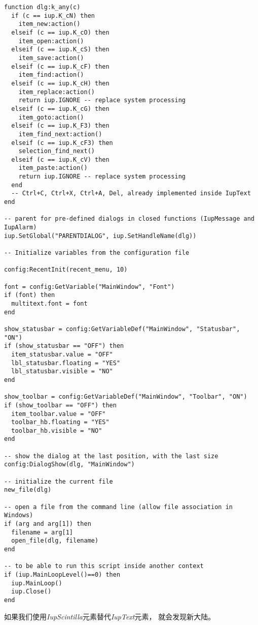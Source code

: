\documentclass{ctexart}
\begin{document}
\begin{lstlisting}
function dlg:k_any(c)
  if (c == iup.K_cN) then
    item_new:action()
  elseif (c == iup.K_cO) then
    item_open:action()
  elseif (c == iup.K_cS) then
    item_save:action()
  elseif (c == iup.K_cF) then
    item_find:action()
  elseif (c == iup.K_cH) then
    item_replace:action()
    return iup.IGNORE -- replace system processing
  elseif (c == iup.K_cG) then
    item_goto:action()
  elseif (c == iup.K_F3) then
    item_find_next:action()
  elseif (c == iup.K_cF3) then
    selection_find_next()
  elseif (c == iup.K_cV) then
    item_paste:action()  
    return iup.IGNORE -- replace system processing
  end
  -- Ctrl+C, Ctrl+X, Ctrl+A, Del, already implemented inside IupText
end

-- parent for pre-defined dialogs in closed functions (IupMessage and IupAlarm)
iup.SetGlobal("PARENTDIALOG", iup.SetHandleName(dlg))

-- Initialize variables from the configuration file

config:RecentInit(recent_menu, 10)
 
font = config:GetVariable("MainWindow", "Font")
if (font) then
  multitext.font = font
end

show_statusbar = config:GetVariableDef("MainWindow", "Statusbar", "ON")
if (show_statusbar == "OFF") then
  item_statusbar.value = "OFF"
  lbl_statusbar.floating = "YES"
  lbl_statusbar.visible = "NO"
end

show_toolbar = config:GetVariableDef("MainWindow", "Toolbar", "ON")
if (show_toolbar == "OFF") then
  item_toolbar.value = "OFF"
  toolbar_hb.floating = "YES"
  toolbar_hb.visible = "NO"
end

-- show the dialog at the last position, with the last size
config:DialogShow(dlg, "MainWindow")

-- initialize the current file
new_file(dlg)

-- open a file from the command line (allow file association in Windows)
if (arg and arg[1]) then
  filename = arg[1]
  open_file(dlg, filename)
end

-- to be able to run this script inside another context
if (iup.MainLoopLevel()==0) then
  iup.MainLoop()
  iup.Close()
end
\end{lstlisting}

如果我们使用\emph{IupScintilla}元素替代\emph{IupText}元素，
就会发现新大陆。
\end{document}
